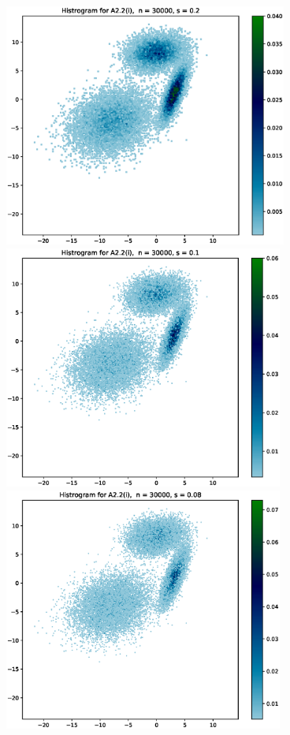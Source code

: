 \documentclass{article}
\begin{document}
\includegraphics[height=8cm]{Figures_for_A2.2_i//8.eps}\\
\hspace*{-1.5cm}\includegraphics[height=8cm]{Figures_for_A2.2_i//9.eps} \hspace*{-1.5cm}
\includegraphics[height=8cm]{Figures_for_A2.2_i//10.eps}\\
\end{document}
